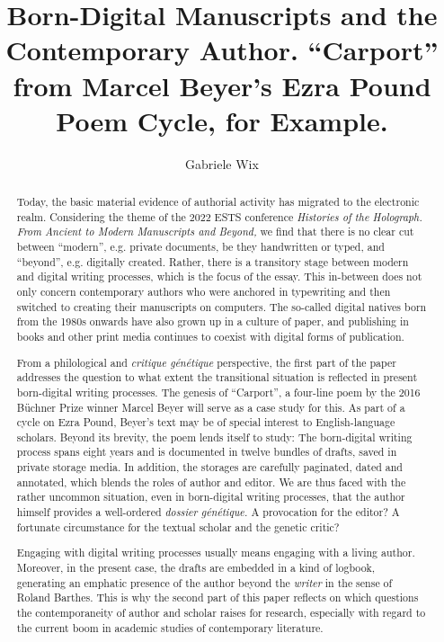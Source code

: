 \documentclass{article}
\author{Gabriele Wix}
\title{Born-Digital Manuscripts and the Contemporary Author. ``Carport'' from Marcel Beyer's Ezra Pound Poem Cycle, for Example.}
\begin{document}
\maketitle

\begin{abstract}
Today, the basic material evidence of authorial activity has migrated to
the electronic realm. Considering the theme of the 2022 ESTS conference
\emph{Histories of the Holograph.} \emph{From Ancient to Modern
Manuscripts and Beyond,} we find that there is no clear cut between
``modern'', e.g. private documents, be they handwritten or typed, and
``beyond'', e.g. digitally created. Rather, there is a transitory stage
between modern and digital writing processes, which is the focus of the
essay. This in-between does not only concern contemporary authors who
were anchored in typewriting and then switched to creating their
manuscripts on computers. The so-called digital natives born from the
1980s onwards have also grown up in a culture of paper, and publishing
in books and other print media continues to coexist with digital forms
of publication.

From a philological and \emph{critique génétique} perspective, the first
part of the paper addresses the question to what extent the transitional
situation is reflected in present born-digital writing processes. The
genesis of ``Carport'', a four-line poem by the 2016 Büchner Prize
winner Marcel Beyer will serve as a case study for this. As part of a
cycle on Ezra Pound, Beyer's text may be of special interest to
English-language scholars. Beyond its brevity, the poem lends itself to
study: The born-digital writing process spans eight years and is
documented in twelve bundles of drafts, saved in private storage media.
In addition, the storages are carefully paginated, dated and annotated,
which blends the roles of author and editor. We are thus faced with the
rather uncommon situation, even in born-digital writing processes, that
the author himself provides a well-ordered \emph{dossier génétique.} A
provocation for the editor? A fortunate circumstance for the textual
scholar and the genetic critic?

Engaging with digital writing processes usually means engaging with a
living author. Moreover, in the present case, the drafts are embedded in
a kind of logbook, generating an emphatic presence of the author beyond
the \emph{writer} in the sense of Roland Barthes. This is why the
second part of this paper reflects on which questions the
contemporaneity of author and scholar raises for research, especially
with regard to the current boom in academic studies of contemporary
literature.
\end{abstract}
\end{document}
